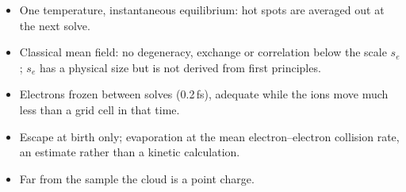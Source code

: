 \begin{itemize}
  \item One temperature, instantaneous equilibrium: hot spots are averaged out at the next solve.
  \item Classical mean field: no degeneracy, exchange or correlation below the scale $s_e$; $s_e$ has a physical size
    but is not derived from first principles.
  \item Electrons frozen between solves (0.2\,fs), adequate while the ions move much less than a grid cell in that
    time.
  \item Escape at birth only; evaporation at the mean electron--electron collision rate, an estimate rather than a
    kinetic calculation.
  \item Far from the sample the cloud is a point charge.
\end{itemize}
